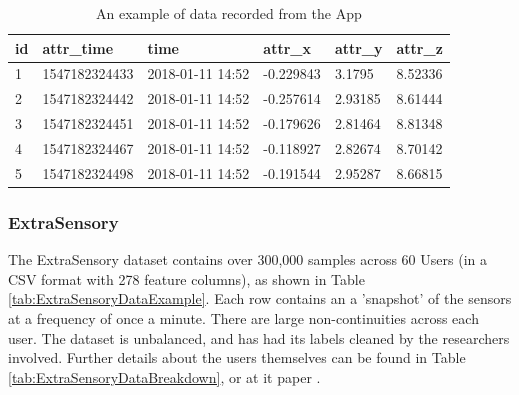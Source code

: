 \documentclass{UoNMCHA}
\newcommand{\tref}[1] {Table \ref{#1}}
\numberwithin{equation}{section}
\begin{document}



    \begin{table} 
        \begin{center}
            \caption{An example of data recorded from the App}\label{tab:ProjectData}
            \begin{tabular}{llllll}
            \hline\hline id & attr\_time & time & attr\_x   & attr\_y & attr\_z \\ \hline
            1  & 1547182324433 & 2018-01-11 14:52 & -0.229843 & 3.1795  & 8.52336 \\
            2  & 1547182324442 & 2018-01-11 14:52 & -0.257614 & 2.93185 & 8.61444 \\
            3  & 1547182324451 & 2018-01-11 14:52 & -0.179626 & 2.81464 & 8.81348 \\
            4  & 1547182324467 & 2018-01-11 14:52 & -0.118927 & 2.82674 & 8.70142 \\
            5  & 1547182324498 & 2018-01-11 14:52 & -0.191544 & 2.95287 & 8.66815 \\ \hline
            \end{tabular}
        \end{center}
    \end{table}

\subsubsection{ExtraSensory}
The ExtraSensory dataset contains over 300,000 samples across 60 Users (in a CSV format with 278 feature columns), as shown in \tref{tab:ExtraSensoryDataExample}. Each row contains an a 'snapshot' of the sensors at a frequency of once a minute. There are large non-continuities across each user. The dataset is unbalanced, and has had its labels cleaned by the researchers involved. Further details about the users themselves can be found in \tref{tab:ExtraSensoryDataBreakdown}, or at it paper \cite{Vaizman2017}.
\end{document}
